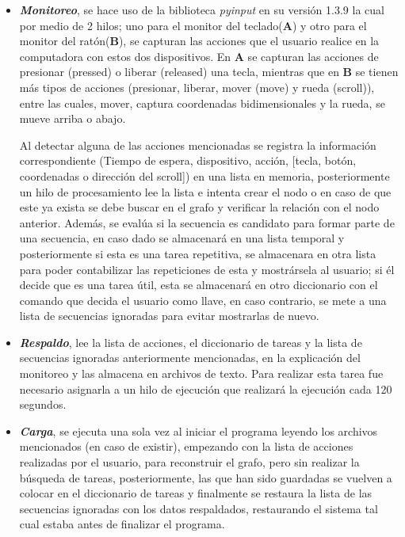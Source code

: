 \begin{itemize}

\item {\textbf{\emph{Monitoreo}}, se hace uso de la biblioteca
 \emph{pyinput} en su versi\'on 1.3.9 la cual por medio de 2 hilos; uno para 
 el monitor del teclado(\textbf{A}) y otro para el monitor del 
 rat\'on(\textbf{B}), se capturan las acciones que el usuario realice en la 
 computadora con estos dos dispositivos. En \textbf{A} se capturan las 
 acciones de presionar (pressed) o liberar (released) una tecla, mientras 
 que en \textbf{B} se tienen m\'as tipos de acciones (presionar, liberar, 
 mover (move) y rueda (scroll)), entre las cuales, mover, captura 
 coordenadas bidimensionales y la rueda, se mueve arriba o abajo. 



Al detectar alguna de las acciones mencionadas se registra la informaci\'on
 correspondiente (Tiempo de espera, dispositivo, acci\'on, [tecla, bot\'on, 
 coordenadas o direcci\'on del scroll]) en una lista en memoria, 
 posteriormente un hilo de 
 procesamiento lee la lista e intenta crear el nodo o en caso de que este 
 ya exista se debe buscar en el grafo y verificar la
 relaci\'on con el nodo anterior. Adem\'as, se eval\'ua si la secuencia es 
 candidato para formar parte de una secuencia, en caso dado se almacenar\'a 
 en una lista temporal y posteriormente si esta es una tarea 
 repetitiva, se almacenara en otra lista para poder contabilizar las 
 repeticiones de esta y mostr\'arsela al usuario; si \'el decide que es 
 una tarea \'util, esta se almacenar\'a en otro diccionario con el comando
 que decida el usuario como llave, en caso contrario, se mete a una lista de 
 secuencias ignoradas para evitar mostrarlas de nuevo.}

\item { \textbf{\emph{Respaldo}}, lee la lista de acciones, el diccionario
 de tareas y la lista de secuencias ignoradas anteriormente mencionadas, en 
 la explicaci\'on del monitoreo y las almacena en archivos de texto. Para
 realizar esta tarea fue necesario asignarla a un hilo de ejecuci\'on que
 realizar\'a la ejecuci\'on cada 120 segundos.}


\item{ \textbf{\emph{Carga}}, se ejecuta una sola vez al iniciar el programa 
 leyendo los archivos mencionados (en caso de existir), empezando con la 
 lista de acciones realizadas por el usuario, para reconstruir el grafo, 
 pero sin realizar la b\'usqueda de tareas, posteriormente, las que han sido 
 guardadas se vuelven a colocar en el diccionario de tareas y finalmente se 
 restaura la lista de las secuencias ignoradas con los datos respaldados, 
 restaurando el sistema tal cual estaba antes de finalizar el programa.}



\end{itemize}
